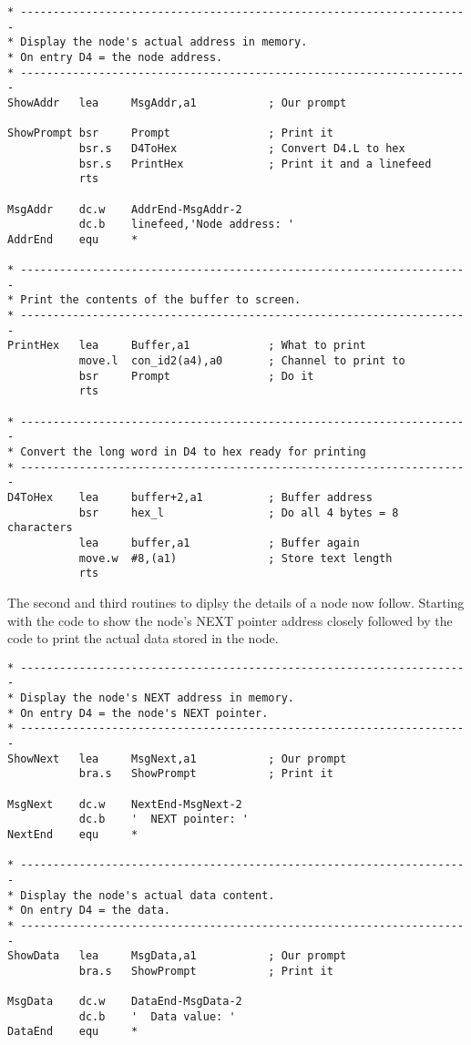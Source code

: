 \begin{lstlisting}[firstnumber=last,caption={Single Linked List - Demo Code - Show Addresses}]
* ---------------------------------------------------------------------
* Display the node's actual address in memory.
* On entry D4 = the node address.
* ---------------------------------------------------------------------
ShowAddr   lea     MsgAddr,a1           ; Our prompt

ShowPrompt bsr     Prompt               ; Print it
           bsr.s   D4ToHex              ; Convert D4.L to hex
           bsr.s   PrintHex             ; Print it and a linefeed
           rts

MsgAddr    dc.w    AddrEnd-MsgAddr-2
           dc.b    linefeed,'Node address: '
AddrEnd    equ     *

* ---------------------------------------------------------------------
* Print the contents of the buffer to screen.
* ---------------------------------------------------------------------
PrintHex   lea     Buffer,a1            ; What to print
           move.l  con_id2(a4),a0       ; Channel to print to
           bsr     Prompt               ; Do it
           rts

* ---------------------------------------------------------------------
* Convert the long word in D4 to hex ready for printing
* ---------------------------------------------------------------------
D4ToHex    lea     buffer+2,a1          ; Buffer address
           bsr     hex_l                ; Do all 4 bytes = 8 characters
           lea     buffer,a1            ; Buffer again
           move.w  #8,(a1)              ; Store text length
           rts
\end{lstlisting}

The second and third routines to diplsy the details of a node now
    follow. Starting with the code to show the node's NEXT pointer address
    closely followed by the code to print the actual data stored in the
    node.

\begin{lstlisting}[firstnumber=last,caption={Single Linked List - Demo Code - Show Next Address}]
* ---------------------------------------------------------------------
* Display the node's NEXT address in memory.
* On entry D4 = the node's NEXT pointer.
* ---------------------------------------------------------------------
ShowNext   lea     MsgNext,a1           ; Our prompt
           bra.s   ShowPrompt           ; Print it

MsgNext    dc.w    NextEnd-MsgNext-2
           dc.b    '  NEXT pointer: '
NextEnd    equ     *

* ---------------------------------------------------------------------
* Display the node's actual data content.
* On entry D4 = the data.
* ---------------------------------------------------------------------
ShowData   lea     MsgData,a1           ; Our prompt
           bra.s   ShowPrompt           ; Print it

MsgData    dc.w    DataEnd-MsgData-2
           dc.b    '  Data value: '
DataEnd    equ     *
\end{lstlisting}

